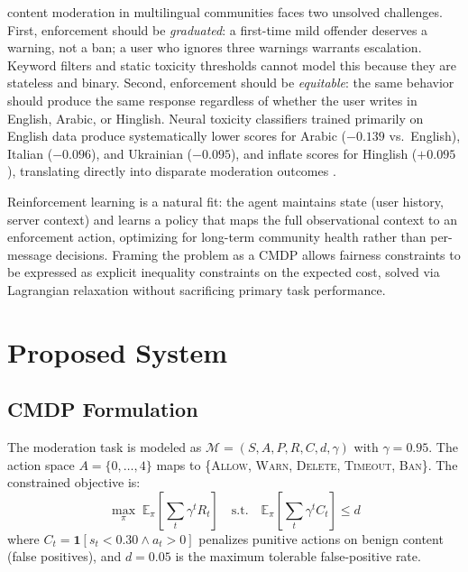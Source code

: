 \documentclass[journal]{IEEEtran}
\begin{document}
 content moderation in multilingual communities faces
two unsolved challenges. First, enforcement should be \textit{graduated}: a
first-time mild offender deserves a warning, not a ban; a user who ignores three
warnings warrants escalation. Keyword filters and static toxicity thresholds
cannot model this because they are stateless and binary. Second, enforcement
should be \textit{equitable}: the same behavior should produce the same response
regardless of whether the user writes in English, Arabic, or Hinglish.
Neural toxicity classifiers trained primarily on English data produce
systematically lower scores for Arabic ($-0.139$ vs.\ English), Italian
($-0.096$), and Ukrainian ($-0.095$), and inflate scores for Hinglish
($+0.095$), translating directly into disparate moderation outcomes
\cite{conneau2020, dementieva2023}.

Reinforcement learning is a natural fit: the agent maintains state (user
history, server context) and learns a policy that maps the full observational
context to an enforcement action, optimizing for long-term community health
rather than per-message decisions. Framing the problem as a CMDP
\cite{altman1999} allows fairness constraints to be expressed as explicit
inequality constraints on the expected cost, solved via Lagrangian relaxation
\cite{stooke2020} without sacrificing primary task performance.


\section{Proposed System}

\subsection{CMDP Formulation}

The moderation task is modeled as $\mathcal{M} = (S, A, P, R, C, d, \gamma)$
with $\gamma = 0.95$. The action space $A = \{0,\ldots,4\}$ maps to
\{\textsc{Allow}, \textsc{Warn}, \textsc{Delete}, \textsc{Timeout}, \textsc{Ban}\}.
The constrained objective is:
\begin{equation}
  \max_\pi\;\mathbb{E}_\pi\!\left[\sum_t \gamma^t R_t\right]
  \quad\text{s.t.}\quad
  \mathbb{E}_\pi\!\left[\sum_t \gamma^t C_t\right] \leq d
\end{equation}
where $C_t = \mathbf{1}[s_t < 0.30 \wedge a_t > 0]$ penalizes punitive actions
on benign content (false positives), and $d = 0.05$ is the maximum tolerable
false-positive rate.
\end{document}
